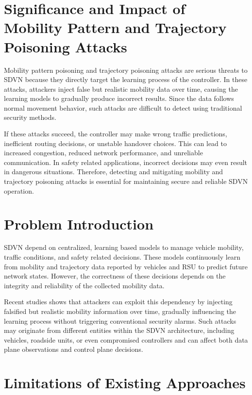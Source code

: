 \documentclass[12pt, a4paper]{report}
\begin{document}
\section{Significance and Impact of Mobility Pattern and Trajectory Poisoning Attacks}
Mobility pattern poisoning and trajectory poisoning attacks are serious threats to SDVN because they directly target the learning process of the controller. In these attacks, attackers inject false but realistic mobility data over time, causing the learning models to gradually produce incorrect results. Since the data follows normal movement behavior, such attacks are difficult to detect using traditional security methods.

If these attacks succeed, the controller may make wrong traffic predictions, inefficient routing decisions, or unstable handover choices. This can lead to increased congestion, reduced network performance, and unreliable communication. In safety related applications, incorrect decisions may even result in dangerous situations. Therefore, detecting and mitigating mobility and trajectory poisoning attacks is essential for maintaining secure and reliable SDVN operation.

\section{Problem Introduction}

SDVN depend on centralized, learning based models to manage vehicle mobility, traffic conditions, and safety related decisions. These models continuously learn from mobility and trajectory data reported by vehicles and RSU to predict future network states. However, the correctness of these decisions depends on the integrity and reliability of the collected mobility data.

Recent studies shows that attackers can exploit this dependency by injecting falsified but realistic mobility information over time, gradually influencing the learning process without triggering conventional security alarms. Such attacks may originate from different entities within the SDVN architecture, including vehicles, roadside units, or even compromised controllers and can affect both data plane observations and control plane decisions.
\section{Limitations of Existing Approaches}
\end{document}

